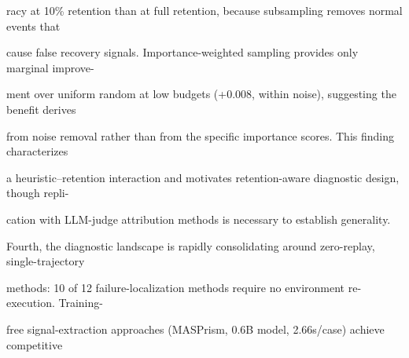 \begin{flushleft}
\noindent racy at 10\% retention than at full retention, because subsampling removes normal events that\par
\noindent cause false recovery signals. Importance-weighted sampling provides only marginal improve-\par
\noindent ment over uniform random at low budgets (+0.008, within noise), suggesting the benefit derives\par
\noindent from noise removal rather than from the specific importance scores. This finding characterizes\par
\noindent a heuristic–retention interaction and motivates retention-aware diagnostic design, though repli-\par
\noindent cation with LLM-judge attribution methods is necessary to establish generality.\par
\noindent  Fourth, the diagnostic landscape is rapidly consolidating around zero-replay, single-trajectory\par
\noindent methods: 10 of 12 failure-localization methods require no environment re-execution. Training-\par
\noindent free signal-extraction approaches (MASPrism, 0.6B model, 2.66s/case) achieve competitive\par
\end{flushleft}

